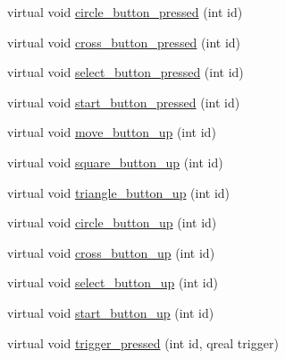 \begin{DoxyCompactItemize}
virtual void \hyperlink{class_game_state_a357c6dad0f25eb906fef35eb6ac5246d}{circle\-\_\-button\-\_\-pressed} (int id)
\item 
virtual void \hyperlink{class_game_state_a84f167bef2d54500e48b793b6dd68ca2}{cross\-\_\-button\-\_\-pressed} (int id)
\item 
virtual void \hyperlink{class_game_state_a0e98d61c64977dc40a2b1fa78d577d37}{select\-\_\-button\-\_\-pressed} (int id)
\item 
virtual void \hyperlink{class_game_state_a1bfc60b9d4d13d685e0c6052e53a90e5}{start\-\_\-button\-\_\-pressed} (int id)
\item 
virtual void \hyperlink{class_game_state_a317ed472fb48c3f23e5c62bc01300634}{move\-\_\-button\-\_\-up} (int id)
\item 
virtual void \hyperlink{class_game_state_a9877350c777a2d4bef09a3d082e1a2e5}{square\-\_\-button\-\_\-up} (int id)
\item 
virtual void \hyperlink{class_game_state_a63707d4c805887ad5543cdd8eb2ced48}{triangle\-\_\-button\-\_\-up} (int id)
\item 
virtual void \hyperlink{class_game_state_a6f1138a791f40ffbc5e664270cb10738}{circle\-\_\-button\-\_\-up} (int id)
\item 
virtual void \hyperlink{class_game_state_a11074db143ac9366ab77b046b4d7d880}{cross\-\_\-button\-\_\-up} (int id)
\item 
virtual void \hyperlink{class_game_state_a94aac39e551c83e59cac566cb02e0df2}{select\-\_\-button\-\_\-up} (int id)
\item 
virtual void \hyperlink{class_game_state_ae782ffae3708e9ff31306abce53ce8ea}{start\-\_\-button\-\_\-up} (int id)
\item 
virtual void \hyperlink{class_game_state_a71ce465f73537005a559b429289b9fdd}{trigger\-\_\-pressed} (int id, qreal trigger)
\end{DoxyCompactItemize}
